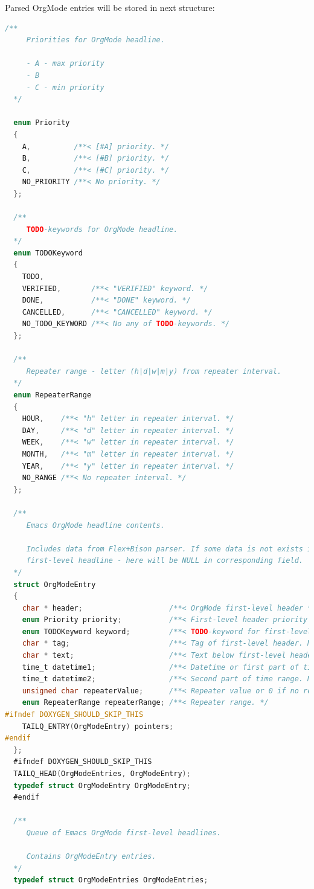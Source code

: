 \documentclass[a4paper,12pt,oneside]{scrartcl}
\begin{document}
Parsed OrgMode entries will be stored in next structure:
\begin{lstlisting}[language=C, caption={Structure to store OrgMode entries}]
  /**
     Priorities for OrgMode headline.

     - A - max priority
     - B
     - C - min priority
  */

  enum Priority
  {
	A,          /**< [#A] priority. */
	B,          /**< [#B] priority. */
	C,          /**< [#C] priority. */
	NO_PRIORITY /**< No priority. */
  };

  /**
     TODO-keywords for OrgMode headline.
  */
  enum TODOKeyword
  {
	TODO,
	VERIFIED,       /**< "VERIFIED" keyword. */
	DONE,           /**< "DONE" keyword. */
	CANCELLED,      /**< "CANCELLED" keyword. */
	NO_TODO_KEYWORD /**< No any of TODO-keywords. */
  };

  /**
     Repeater range - letter (h|d|w|m|y) from repeater interval.
  */
  enum RepeaterRange
  {
	HOUR,    /**< "h" letter in repeater interval. */
	DAY,     /**< "d" letter in repeater interval. */
	WEEK,    /**< "w" letter in repeater interval. */
	MONTH,   /**< "m" letter in repeater interval. */
	YEAR,    /**< "y" letter in repeater interval. */
	NO_RANGE /**< No repeater interval. */
  };

  /**
     Emacs OrgMode headline contents.

     Includes data from Flex+Bison parser. If some data is not exists in
     first-level headline - here will be NULL in corresponding field.
  */
  struct OrgModeEntry
  {
	char * header;                    /**< OrgMode first-level header */
	enum Priority priority;           /**< First-level header priority */
	enum TODOKeyword keyword;         /**< TODO-keyword for first-level header. */
	char * tag;                       /**< Tag of first-level header. May be NULL if no exists. */
	char * text;                      /**< Text below first-level header. May be NULL if no exists. */
	time_t datetime1;                 /**< Datetime or first part of time range or (time_t)-1 if no datetime. */
	time_t datetime2;                 /**< Second part of time range. May be (time_t)-1 if no time range on datetime. */
	unsigned char repeaterValue;      /**< Repeater value or 0 if no repeater interval. */
	enum RepeaterRange repeaterRange; /**< Repeater range. */
#ifndef DOXYGEN_SHOULD_SKIP_THIS
	TAILQ_ENTRY(OrgModeEntry) pointers;
#endif
  };
  #ifndef DOXYGEN_SHOULD_SKIP_THIS
  TAILQ_HEAD(OrgModeEntries, OrgModeEntry);
  typedef struct OrgModeEntry OrgModeEntry;
  #endif

  /**
     Queue of Emacs OrgMode first-level headlines.

     Contains OrgModeEntry entries.
  */
  typedef struct OrgModeEntries OrgModeEntries;
\end{lstlisting}
\end{document}
